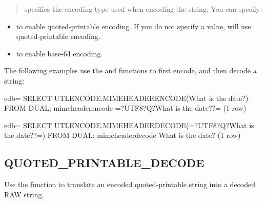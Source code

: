 \documentclass[letterpaper,10pt,english,openany,oneside]{sphinxmanual}
\begin{document}
\begin{quote}

 specifies the encoding type used when encoding the
string. You can specify:
\end{quote}
\begin{itemize}
\item {} 
 to enable quoted-printable encoding. If you do not specify a value,
 will use quoted-printable encoding.

\item {} 
 to enable base-64 encoding.

\end{itemize}


The following examples use the  and 
functions to first encode, and then decode a string:

%
\begin{sphinxVerbatim}[commandchars=\\\{\}]
edb=\PYGZsh{} SELECT UTL\PYGZus{}ENCODE.MIMEHEADER\PYGZus{}ENCODE(\PYGZsq{}What is the date?\PYGZsq{}) FROM DUAL;
      mimeheader\PYGZus{}encode
\PYGZhy{}\PYGZhy{}\PYGZhy{}\PYGZhy{}\PYGZhy{}\PYGZhy{}\PYGZhy{}\PYGZhy{}\PYGZhy{}\PYGZhy{}\PYGZhy{}\PYGZhy{}\PYGZhy{}\PYGZhy{}\PYGZhy{}\PYGZhy{}\PYGZhy{}\PYGZhy{}\PYGZhy{}\PYGZhy{}\PYGZhy{}\PYGZhy{}\PYGZhy{}\PYGZhy{}\PYGZhy{}\PYGZhy{}\PYGZhy{}\PYGZhy{}\PYGZhy{}\PYGZhy{}
 =?UTF8?Q?What is the date??=
(1 row)

edb=\PYGZsh{} SELECT UTL\PYGZus{}ENCODE.MIMEHEADER\PYGZus{}DECODE(\PYGZsq{}=?UTF8?Q?What is the date??=\PYGZsq{}) FROM DUAL;
 mimeheader\PYGZus{}decode
\PYGZhy{}\PYGZhy{}\PYGZhy{}\PYGZhy{}\PYGZhy{}\PYGZhy{}\PYGZhy{}\PYGZhy{}\PYGZhy{}\PYGZhy{}\PYGZhy{}\PYGZhy{}\PYGZhy{}\PYGZhy{}\PYGZhy{}\PYGZhy{}\PYGZhy{}\PYGZhy{}\PYGZhy{}
 What is the date?
(1 row)
\end{sphinxVerbatim}

\newpage


\subsection{QUOTED\_PRINTABLE\_DECODE}
\label{\detokenize{quoted_printable_decode::doc}}\label{\detokenize{quoted_printable_decode:quoted-printable-decode}}
Use the  function to translate an encoded
quoted-printable string into a decoded RAW string.
\end{document}

